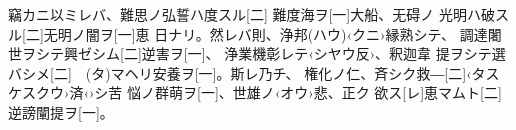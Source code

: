\documentclass[
book,           %
tate,           %
twocolumn,      %
column_gap=3zw, %
paper=a4paper,  %
fontsize=17Q,   %
jafontsize=17Q, %
gutter=30mm,    %
fore-edge=25mm, %
head_space=30mm,%
foot_space=30mm,%
]{jlreq}
\begin{document}
\newpage
\Kanbun
竊カニ以ミレバ、難思ノ弘誓ハ度スル[二]
難度海ヲ[一]大船、无碍ノ
光明ハ破スル[二]无明ノ闇ヲ[一]恵
日ナリ。然レバ則、浄邦(ハウ)‹クニ›縁熟シテ、
調達闍世ヲシテ興ゼシム[二]逆害ヲ[一]、
浄業機彰レテ‹シヤウ反›、釈迦韋
提ヲシテ選バシメ[二]　(タ)マヘリ安養ヲ[一]。斯レ乃チ、
権化ノ仁、斉シク救―[二]‹タスケスクウ›済‹›シ苦
悩ノ群萌ヲ[一]、世雄ノ‹オウ›悲、正ク
欲ス[レ]恵マムト[二]逆謗闡提ヲ[一]。
\EndKanbun

\end{document}
